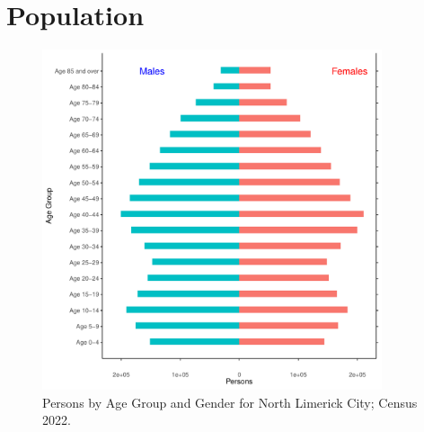 \documentclass{article}
\begin{document}
\pagebreak

\section{Population} 
\label{sect:Pop}

\begin{figure}[h]
	\centering
	\includegraphics[width = 100mm]{../figures/PyramidPlot.pdf}
	\caption{Persons by Age Group and Gender for North Limerick City; Census 2022.}
	\label{fig:2ae19629-1a6a-13a3-e055-000000000001}
	\end{figure}
\end{document}
